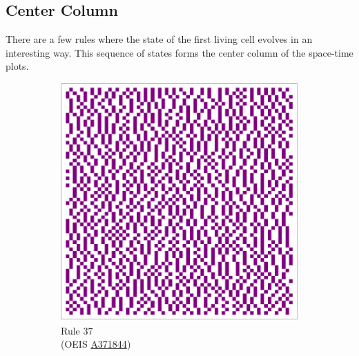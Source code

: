 \documentclass{article}
\begin{document}
\pagebreak
\subsection{Center Column} \label{center-column}
\noindent There are a few rules where the state of the first living cell evolves in an interesting way. This sequence of states forms the center column of the space-time plots.

\begin{figure}[H]
    \centering
    \begin{subfigure}[b]{0.24\textwidth}
        \centering
        \includegraphics[width=.9\textwidth]{graphics/behavior/center-columns/rule-37-center_column_plot-4096.pdf}
        \caption*{Rule 37\\(OEIS \href{https://oeis.org/A371844}{A371844})}
        \label{fig:rule-37-center_column_plot-4096}
    \end{subfigure}
    \begin{subfigure}[b]{0.24\textwidth}
        \centering

\end{subfigure}
\end{figure}
\end{document}
